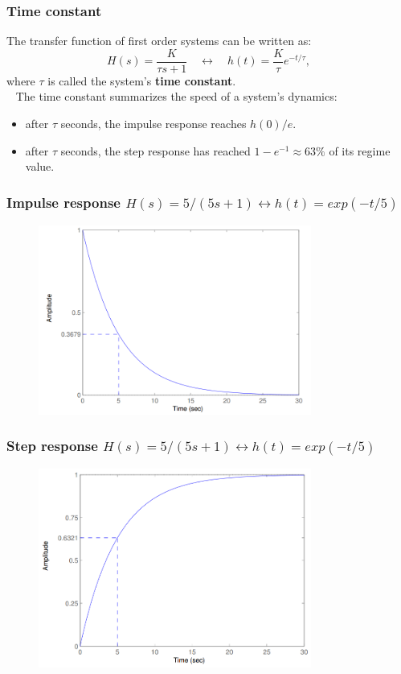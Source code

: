 \begin{frame}
\frametitle{Time constant}
The transfer function of first order systems can be written as:
\begin{equation*}
H(s) = \frac{K}{\tau s + 1}\quad \leftrightarrow \quad h(t) = \frac{K}{\tau} e^{-t/\tau},
\end{equation*}
where $\tau$ is called the system's \textbf{time constant}.\\
\ \newline
\pause
The time constant summarizes the speed of a system's dynamics:
\begin{itemize}
\item after $\tau$ seconds, the impulse response reaches $h(0)/e$.
\item after $\tau$ seconds, the step response has reached $1-e^{-1}\approx63\%$ of its regime value.
\end{itemize}
\end{frame}

\begin{frame}
\frametitle{Impulse response $H(s)=5/(5s+1) \leftrightarrow h(t)=exp(-t/5)$}
\begin{figure}
\centering
\includegraphics[width=0.8\textwidth]{time-constant-impulse.png}
\end{figure}
\end{frame}

\begin{frame}
\frametitle{Step response $H(s)=5/(5s+1) \leftrightarrow h(t)=exp(-t/5)$}
\begin{figure}
\centering
\includegraphics[width=0.8\textwidth]{time-constant-step.png}
\end{figure}
\end{frame}

